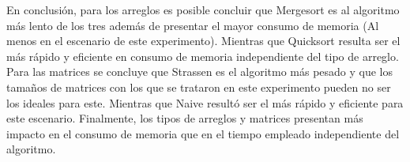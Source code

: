 En conclusión, para los arreglos es posible concluir que Mergesort es al algoritmo más lento de los tres 
además de presentar el mayor consumo de memoria (Al menos en el escenario de este experimento). 
Mientras que Quicksort resulta ser el más rápido y eficiente en consumo de memoria independiente del tipo de arreglo. 
Para las matrices se concluye que Strassen es el algoritmo más pesado y que los tamaños de matrices con los que se trataron en este experimento pueden no ser los ideales para este. 
Mientras que Naive resultó ser el más rápido y eficiente para este escenario. 
Finalmente, los tipos de arreglos y matrices presentan más impacto en el consumo de memoria que en el tiempo empleado independiente del algoritmo. 